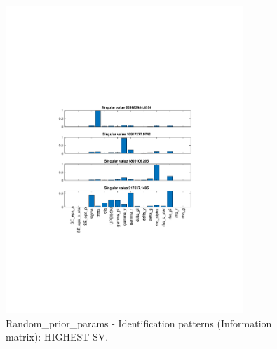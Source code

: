 
\begin{figure}[H]
\centering 
\includegraphics[width=0.8\textwidth]{fiscal/identification/fiscal_ident_pattern_Random_prior_params_2}
\caption{Random_prior_params - Identification patterns (Information matrix): HIGHEST SV.}\label{Fig:ident_pattern:Random_prior_params:2}
\end{figure}

